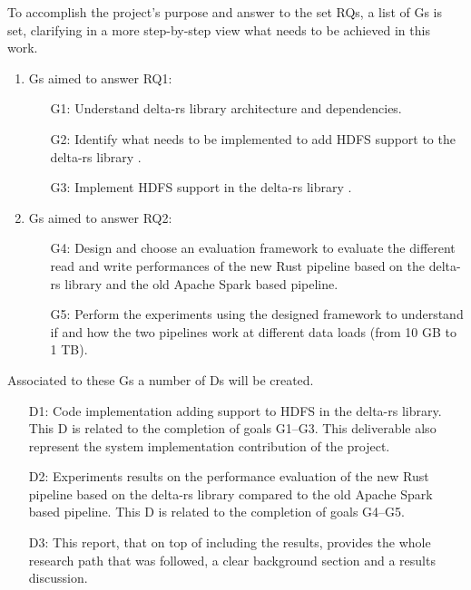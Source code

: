 To accomplish the project's purpose and answer to the set \glspl{RQ}, a list of \glspl{G} is set, clarifying in a more step-by-step view what needs to be achieved in this work. 

\begin{enumerate}
    \item \glspl{G} aimed to answer RQ1: 
        \begin{enumerate}
            \item[G1:] Understand delta-rs library \cite{DeltaioDeltars2024} architecture and dependencies.
            \item[G2:] Identify what needs to be implemented to add \gls{HDFS} support to the delta-rs library \cite{DeltaioDeltars2024}.  
            \item[G3:] Implement \gls{HDFS} support in the delta-rs library \cite{DeltaioDeltars2024}.
        \end{enumerate}
    \item \glspl{G} aimed to answer RQ2:
        \begin{enumerate}
            \item[G4:] Design and choose an evaluation framework to evaluate the different read and write performances of the new Rust pipeline based on the delta-rs library \cite{DeltaioDeltars2024} and the old Apache Spark based pipeline.
            \item[G5:] Perform the experiments using the designed framework to understand if and how the two pipelines work at different data loads (from 10 GB to 1 TB).
        \end{enumerate}
\end{enumerate}

Associated to these \glspl{G} a number of \glspl{D} will be created. 
\begin{enumerate}
    \item[D1:] Code implementation adding support to \gls{HDFS} in the delta-rs library. This \gls{D} is related to the completion of goals G1--G3. This deliverable also represent the system implementation contribution of the project.
    \item[D2:] Experiments results on the performance evaluation of the new Rust pipeline based on the delta-rs library \cite{DeltaioDeltars2024} compared to the old Apache Spark based pipeline.
    This \gls{D} is related to the completion of goals G4--G5.
    \item[D3:] This report, that on top of including the results, provides the whole research path that was followed, a clear background section and a results discussion.
\end{enumerate}